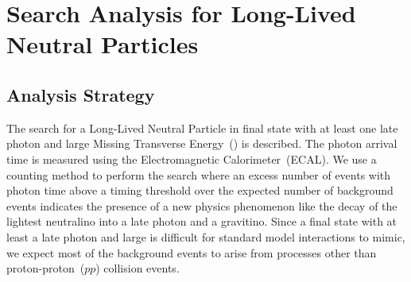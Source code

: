 \chapter{Search Analysis for Long-Lived Neutral Particles }
\section{Analysis Strategy}\label{Analysis}
The search for a Long-Lived Neutral Particle in final state with at least one late photon and large Missing Transverse Energy~(\MET) is described. The photon arrival time is measured using the Electromagnetic Calorimeter~(ECAL). We use a counting method to perform the search where an excess number of events with photon time above a timing threshold over the expected number of background events indicates the presence of a new physics phenomenon like the decay of the lightest neutralino into a late photon and a gravitino. Since a final state with at least a late photon and large \MET is difficult for standard model interactions to mimic, we expect most of the background events to arise from processes other than proton-proton~($pp$) collision events.
